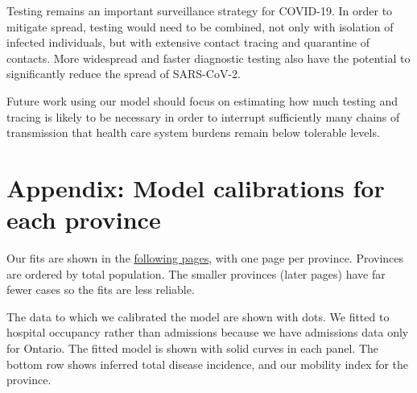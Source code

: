 \documentclass[12pt]{article}\usepackage[]{graphicx}\usepackage[]{color}
\begin{document}
Testing remains an important surveillance strategy for COVID-19.  In
order to mitigate spread, testing would need to be combined, not only
with isolation of infected individuals, but with extensive contact
tracing and quarantine of contacts.    More
widespread and faster diagnostic testing \cite{Will+20,Wyll+20} also
have the potential to significantly reduce the spread of SARS-CoV-2.

Future work using our model should focus on estimating how much
testing and tracing is likely to be necessary in order to interrupt
sufficiently many chains of transmission that health care system
burdens remain below tolerable levels.


\clearpage

\section{Appendix: Model calibrations for each province}\label{sec:supp}

Our fits are shown in the \hyperlink{current.fits}{following pages},
with one page per province.  Provinces are ordered by total
population. The smaller provinces (later pages) have far fewer cases
so the fits are less reliable.

The data to which we calibrated the model are shown with dots.
We fitted to hospital occupancy rather than admissions because
we have admissions data only for Ontario.  The fitted model
is shown with solid curves in each panel.
The bottom row shows inferred total disease incidence, 
and 
our mobility index for the province.

\FloatBarrier
\clearpage


\clearpage



\end{document}
